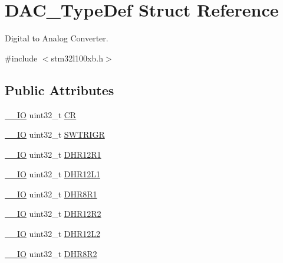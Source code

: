 \hypertarget{struct_d_a_c___type_def}{\section{D\-A\-C\-\_\-\-Type\-Def Struct Reference}
\label{struct_d_a_c___type_def}
}


Digital to Analog Converter.  




{\ttfamily \#include $<$stm32l100xb.\-h$>$}

\subsection*{Public Attributes}
\begin{DoxyCompactItemize}
\item 
\hyperlink{core__sc300_8h_aec43007d9998a0a0e01faede4133d6be}{\-\_\-\-\_\-\-I\-O} uint32\-\_\-t \hyperlink{struct_d_a_c___type_def_a394324f0b573837ca15a87127b2a37ea}{C\-R}
\item 
\hyperlink{core__sc300_8h_aec43007d9998a0a0e01faede4133d6be}{\-\_\-\-\_\-\-I\-O} uint32\-\_\-t \hyperlink{struct_d_a_c___type_def_a4ccb66068a1ebee1179574dda20206b6}{S\-W\-T\-R\-I\-G\-R}
\item 
\hyperlink{core__sc300_8h_aec43007d9998a0a0e01faede4133d6be}{\-\_\-\-\_\-\-I\-O} uint32\-\_\-t \hyperlink{struct_d_a_c___type_def_afbfd2855cdb81939b4efc58e08aaf3e5}{D\-H\-R12\-R1}
\item 
\hyperlink{core__sc300_8h_aec43007d9998a0a0e01faede4133d6be}{\-\_\-\-\_\-\-I\-O} uint32\-\_\-t \hyperlink{struct_d_a_c___type_def_a5eb63912e39085e3e13d64bdb0cf38bd}{D\-H\-R12\-L1}
\item 
\hyperlink{core__sc300_8h_aec43007d9998a0a0e01faede4133d6be}{\-\_\-\-\_\-\-I\-O} uint32\-\_\-t \hyperlink{struct_d_a_c___type_def_a3a382d341fb608a04390bacb8c00b0f0}{D\-H\-R8\-R1}
\item 
\hyperlink{core__sc300_8h_aec43007d9998a0a0e01faede4133d6be}{\-\_\-\-\_\-\-I\-O} uint32\-\_\-t \hyperlink{struct_d_a_c___type_def_ab1f777540c487c26bf27e6fa37a644cc}{D\-H\-R12\-R2}
\item 
\hyperlink{core__sc300_8h_aec43007d9998a0a0e01faede4133d6be}{\-\_\-\-\_\-\-I\-O} uint32\-\_\-t \hyperlink{struct_d_a_c___type_def_a9f612b6b3e065e810e5a2fb254d6a40b}{D\-H\-R12\-L2}
\item 
\hyperlink{core__sc300_8h_aec43007d9998a0a0e01faede4133d6be}{\-\_\-\-\_\-\-I\-O} uint32\-\_\-t \hyperlink{struct_d_a_c___type_def_a3b096b71656f8fb32cd18b4c8b1d2334}{D\-H\-R8\-R2}

\end{DoxyCompactItemize}
